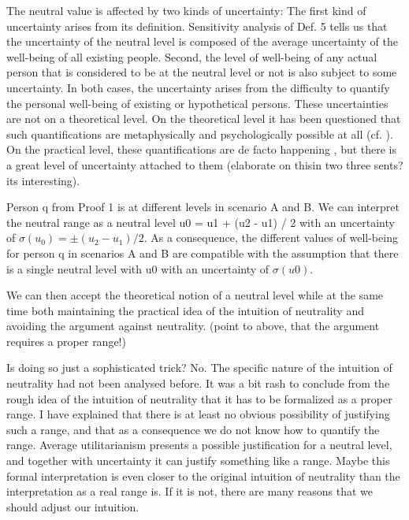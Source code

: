 The neutral value is affected by two kinds of uncertainty: The first kind of uncertainty arises from its definition. Sensitivity analysis of Def. 5 tells us that the uncertainty of the neutral level is composed of the average uncertainty of the well-being of all existing people. Second, the level of well-being of any actual person that is considered to be at the neutral level or not is also subject to some uncertainty. In both cases, the uncertainty arises from the difficulty to quantify the personal well-being of existing or hypothetical persons. These uncertainties are not on a theoretical level. On the theoretical level it has been questioned that such quantifications are metaphysically and psychologically possible at all (cf. ). On the practical level, these quantifications are de facto happening \cite[ch.~9]{broome_2004}, but there is a great level of uncertainty attached to them (elaborate on thisin two three sents? its interesting).  

Person q from Proof 1 is at different levels in scenario A and B. We can interpret the neutral range as a neutral level u0 = u1 + (u2 - u1) / 2 with an uncertainty of $\sigma (u_0) = \pm (u_2 - u_1) / 2$. As a consequence, the different values of well-being for person q in scenarios A and B are compatible with the assumption that there is a single neutral level with u0 with an uncertainty of $\sigma(u0)$.  

We can then accept the theoretical notion of a neutral level while at the same time both maintaining the practical idea of the intuition of neutrality and avoiding the argument against neutrality. (point to above, that the argument requires a proper range!) 

Is doing so just a sophisticated trick? No. The specific nature of the intuition of neutrality had not been analysed before. It was a bit rash to conclude from the rough idea of the intuition of neutrality that it has to be formalized as a proper range. I have explained that there is at least no obvious possibility of justifying such a range, and that as a consequence we do not know how to quantify the range. Average utilitarianism presents a possible justification for a neutral level, and together with uncertainty it can justify something like a range. Maybe this formal interpretation is even closer to the original intuition of neutrality than the interpretation as a real range is. If it is not, there are many reasons that we should adjust our intuition.  
